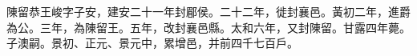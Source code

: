 
\begin{pinyinscope}
陳留恭王峻字子安，建安二十一年封郿侯。二十二年，徙封襄邑。黃初二年，進爵為公。三年，為陳留王。五年，改封襄邑縣。太和六年，又封陳留。甘露四年薨。子澳嗣。景初、正元、景元中，累增邑，并前四千七百戶。


\end{pinyinscope}